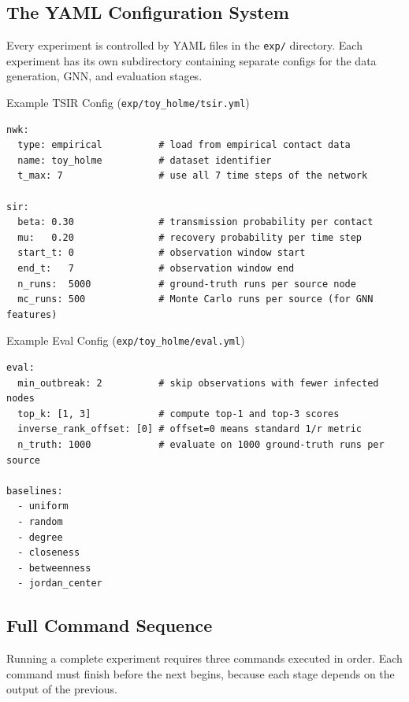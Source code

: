 \subsection{The YAML Configuration System}

Every experiment is controlled by YAML files in the \texttt{exp/} directory. Each experiment has its own subdirectory containing separate configs for the data generation, GNN, and evaluation stages.

\begin{codewalk}{Example TSIR Config (\texttt{exp/toy\_holme/tsir.yml})}
\begin{lstlisting}[language={}]
nwk:
  type: empirical          # load from empirical contact data
  name: toy_holme          # dataset identifier
  t_max: 7                 # use all 7 time steps of the network

sir:
  beta: 0.30               # transmission probability per contact
  mu:   0.20               # recovery probability per time step
  start_t: 0               # observation window start
  end_t:   7               # observation window end
  n_runs:  5000            # ground-truth runs per source node
  mc_runs: 500             # Monte Carlo runs per source (for GNN features)
\end{lstlisting}
\end{codewalk}

\begin{codewalk}{Example Eval Config (\texttt{exp/toy\_holme/eval.yml})}
\begin{lstlisting}[language={}]
eval:
  min_outbreak: 2          # skip observations with fewer infected nodes
  top_k: [1, 3]            # compute top-1 and top-3 scores
  inverse_rank_offset: [0] # offset=0 means standard 1/r metric
  n_truth: 1000            # evaluate on 1000 ground-truth runs per source

baselines:
  - uniform
  - random
  - degree
  - closeness
  - betweenness
  - jordan_center
\end{lstlisting}
\end{codewalk}

\subsection{Full Command Sequence}

Running a complete experiment requires three commands executed in order. Each command must finish before the next begins, because each stage depends on the output of the previous.

